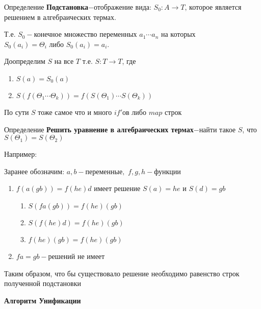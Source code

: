 \documentclass[12pt, a4paper]{article}
\begin{document}
	\par Определение \textbf{Подстановка}$-$отображение вида: $S_0:A\to T$, которое является решением в алгебраических термах.\par Т.е. $S_0-$конечное множество переменных $a_1\dotsb a_n$ на которых $S_0(a_i)=\Theta_i\text{ либо }S_0(a_i)=a_i$.\par
	Доопределим $S$ на все $T$ т.е. $S:T\to T$, где \begin{enumerate}
		\item $S(a)=S_0(a)$
		\item $S(f(\Theta_1 \dotsb \Theta_k))=f(S(\Theta_1) \dotsb S(\Theta_k))$
	\end{enumerate}
	По сути $S$ тоже самое что и много $if'$ов либо $map$ строк\par 
	Определение \textbf{Решить уравнение в алгебраических термах}$-$найти такое $S$, что $S(\Theta_1)=S(\Theta_2)$\par 
	Например:\par 
		Заранее обозначим: $a,b-\text{переменные},$ $f,g,h-\text{функции}$
		\begin{enumerate}
			\item $f(a(gb))=f(he)d$ имеет решение $S(a)=he\text{ и }S(d)=gb$
				\begin{enumerate}
					\item $S(fa(gb))=f(he)(gb)$
					\item $S(f(he)d)=f(he)(gb)$
					\item $f(he)(gb)=f(he)(gb)$
				\end{enumerate}
			\item $fa=gb-$решений не имеет
		\end{enumerate}
		Таким образом, что бы существовало решение необходимо равенство строк полученной подстановки\par
		\textbf{Алгоритм Унификации}\par
\end{document}
